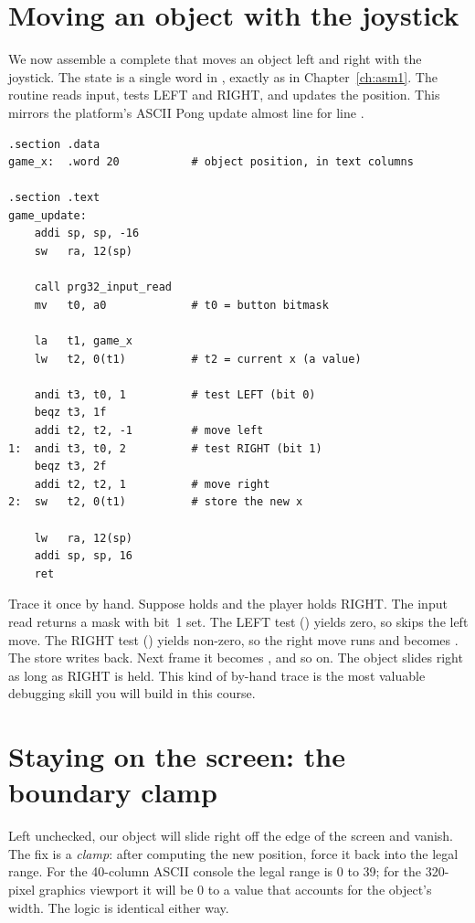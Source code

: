 \section{Moving an object with the joystick}

We now assemble a complete  that moves an object left and right with
the joystick. The state is a single word in , exactly as in
Chapter~\ref{ch:asm1}. The routine reads input, tests LEFT and RIGHT, and updates
the position. This mirrors the platform's ASCII Pong update almost line for line
\citep{prg32repo}.

\begin{lstlisting}[style=asm,caption={A full \code{update}: read input, move on LEFT/RIGHT, store the result. Compare with the platform's \code{pong\_ascii\_update}.}]
.section .data
game_x:  .word 20           # object position, in text columns

.section .text
game_update:
    addi sp, sp, -16
    sw   ra, 12(sp)

    call prg32_input_read
    mv   t0, a0             # t0 = button bitmask

    la   t1, game_x
    lw   t2, 0(t1)          # t2 = current x (a value)

    andi t3, t0, 1          # test LEFT (bit 0)
    beqz t3, 1f
    addi t2, t2, -1         # move left
1:  andi t3, t0, 2          # test RIGHT (bit 1)
    beqz t3, 2f
    addi t2, t2, 1          # move right
2:  sw   t2, 0(t1)          # store the new x

    lw   ra, 12(sp)
    addi sp, sp, 16
    ret
\end{lstlisting}

Trace it once by hand. Suppose  holds  and the player
holds RIGHT. The input read returns a mask with bit~1 set. The LEFT test
() yields zero, so  skips the left move. The RIGHT
test () yields non-zero, so the right move runs and 
becomes . The store writes  back. Next frame it becomes
, and so on. The object slides right as long as RIGHT is held. This kind
of by-hand trace is the most valuable debugging skill you will build in this
course.

\section{Staying on the screen: the boundary clamp}

Left unchecked, our object will slide right off the edge of the screen and
vanish. The fix is a \emph{clamp}: after computing the new position, force it back
into the legal range. For the 40-column ASCII console the legal range is 0 to 39;
for the 320-pixel graphics viewport it will be 0 to a value that accounts for the
object's width. The logic is identical either way.

